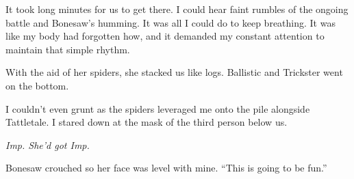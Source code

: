 It took long minutes for us to get there.  I could hear faint rumbles of the ongoing battle and Bonesaw's humming.  It was all I could do to keep breathing.  It was like my body had forgotten how, and it demanded my constant attention to maintain that simple rhythm.



With the aid of her spiders, she stacked us like logs.  Ballistic and Trickster went on the bottom.



I couldn't even grunt as the spiders leveraged me onto the pile alongside Tattletale.  I stared down at the mask of the third person below us.



\emph{Imp.  She'd got Imp.}



Bonesaw crouched so her face was level with mine.  ``This is going to be fun.''





